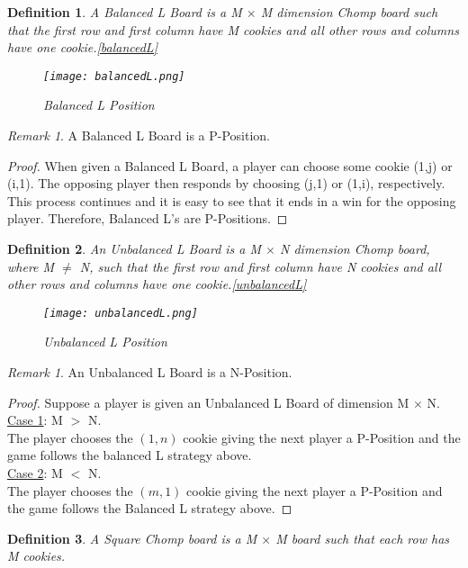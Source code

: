 \documentclass{amsart}
\newtheorem{term}{Definition} %
\theoremstyle{definition}
\theoremstyle{remark}
\newtheorem{rem}[thm]{Remark}
\numberwithin{equation}{section}
\begin{document}
\begin{term}
A Balanced L Board is a M $\times$ M dimension Chomp board such that the first row and first column have M cookies and all other rows and columns have one cookie.\ref{balancedL} 
\begin{figure}[balancedL]
\texttt{[image: balancedL.png]}
\caption{Balanced L Position}
\end{figure}
\end{term}

\begin{rem}
A Balanced L Board is a P-Position.
\end{rem}
\begin{proof}
When given a Balanced L Board, a player can choose some cookie (1,j) or (i,1). The opposing player then responds by choosing (j,1) or (1,i), respectively. This process continues and it is easy to see that it ends in a win for the opposing player. Therefore, Balanced L's are P-Positions.  
\end{proof}

\begin{term}
An Unbalanced L Board is a M $\times$ N dimension Chomp board, where M $\neq$ N, such that the first row and first column have N cookies and all other rows and columns have one cookie.\ref{unbalancedL} 
\begin{figure}[unbalancedL]
\texttt{[image: unbalancedL.png]}
\caption{Unbalanced L Position}
\end{figure}
\end{term}

\begin{rem}
An Unbalanced L Board is a N-Position.
\end{rem}
\begin{proof}
Suppose a player is given an Unbalanced L Board of dimension M $\times$ N.\\
\underline{Case 1}: M $>$ N. \\
The player chooses the $(1,n)$ cookie giving the next player a P-Position and the game follows the balanced L strategy above.\\
\underline{Case 2}: M $<$ N.\\
The player chooses the $(m,1)$ cookie giving the next player a P-Position and the game follows the Balanced L strategy above.
\end{proof}

\begin{term}
A Square Chomp board is a M $\times$ M board such that each row has M cookies. 
\end{term}
\end{document}
